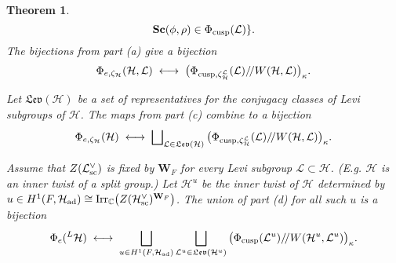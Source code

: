 \documentclass[11pt]{amsart}
\newtheorem{thm}{Theorem}[section]
\theoremstyle{definition}
\newcommand{\mb}{\mathbf}
\newcommand{\mf}{\mathfrak}
\newcommand{\C}{\mathbb C}
\newcommand{\q}{/\!/}
\def\Irr{{\rm Irr}}
\def\cL{{\mathcal L}}
\def\cH{{\mathcal H}}
\def\ad{{\rm ad}}
\def\sc{{\rm sc}}
\def\cusp{{\rm cusp}}
\begin{document}
\begin{thm}
{\[\mathbf{Sc}(\phi,\rho) \in \Phi_\cusp (\cL) \} .
\]
The bijections from part (a) give a bijection
\[
\Phi_{e,\zeta_\cH} (\cH,\cL) \; \longleftrightarrow \; 
\big( \Phi_{\cusp,\zeta_\cH^\cL} (\cL) \q W(\cH,\cL) \big)_\kappa . 
\]
\item Let $\mf{Lev}(\cH)$ be a set of representatives for the conjugacy classes of Levi
subgroups of $\cH$. The maps from part (c) combine to a bijection
\[
\Phi_{e,\zeta_\cH} (\cH) \; \longleftrightarrow \; \bigsqcup\nolimits_{\cL \in \mf{Lev}(\cH)}
\big( \Phi_{\cusp,\zeta_\cH^\cL} (\cL) \q W(\cH,\cL) \big)_\kappa . 
\]
\item Assume that $Z(\cL^\vee_\sc)$ is fixed by $\mb W_F$ for every Levi subgroup 
$\cL \subset \cH$. (E.g. $\cH$ is an inner twist of a split group.)
Let $\cH^u$ be the inner twist of $\cH$ determined by $u \in H^1(F,\cH_\ad) \cong 
\Irr_\C \big( Z (\cH^\vee_{\sc} )^{\mb W_F} \big)$.
The union of part (d) for all such $u$ is a bijection
\[
\Phi_e ({}^L \cH) \; \longleftrightarrow \; \bigsqcup_{u \in H^1 (F,\cH_{\ad})} 
\bigsqcup_{\cL^u \in \mf{Lev}(\cH^u)} 
\big( \Phi_\cusp (\cL^u) \q W(\cH^u,\cL^u) \big)_\kappa . 
\]
}
\end{thm}
\end{document}
